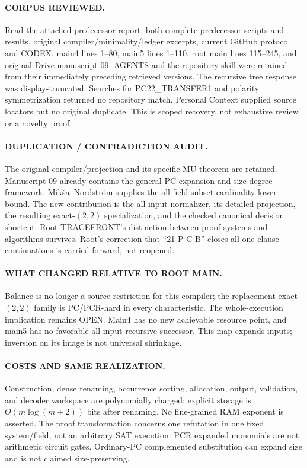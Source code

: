 \documentclass[11pt]{article}
\begin{document}
\paragraph{CORPUS REVIEWED.}
Read the attached predecessor report, both complete predecessor scripts and results, original compiler/minimality/ledger excerpts, current GitHub protocol and CODEX, main4 lines 1--80, main5 lines 1--110, root main lines 115--245, and original Drive manuscript 09. AGENTS and the repository skill were retained from their immediately preceding retrieved versions. The recursive tree response was display-truncated. Searches for PC22\_TRANSFER1 and polarity symmetrization returned no repository match. Personal Context supplied source locators but no original duplicate. This is scoped recovery, not exhaustive review or a novelty proof.

\paragraph{DUPLICATION / CONTRADICTION AUDIT.}
The original compiler/projection and its specific MU theorem are retained. Manuscript 09 already contains the general PC expansion and size-degree framework. Mik\v{s}a--Nordstr\"om supplies the all-field subset-cardinality lower bound. The new contribution is the all-input normalizer, its detailed projection, the resulting exact-$(2,2)$ specialization, and the checked canonical decision shortcut. Root TRACEFRONT's distinction between proof systems and algorithms survives. Root's correction that ``21 P C B'' closes all one-clause continuations is carried forward, not reopened.

\paragraph{WHAT CHANGED RELATIVE TO ROOT MAIN.}
Balance is no longer a source restriction for this compiler; the replacement exact-$(2,2)$ family is PC/PCR-hard in every characteristic. The whole-execution implication remains OPEN. Main4 has no new achievable resource point, and main5 has no favorable all-input recursive successor. This map expands inputs; inversion on its image is not universal shrinkage.

\paragraph{COSTS AND SAME REALIZATION.}
Construction, dense renaming, occurrence sorting, allocation, output, validation, and decoder workspace are polynomially charged; explicit storage is $O(m\log(m+2))$ bits after renaming. No fine-grained RAM exponent is asserted. The proof transformation concerns one refutation in one fixed system/field, not an arbitrary SAT execution. PCR expanded monomials are not arithmetic circuit gates. Ordinary-PC complemented substitution can expand size and is not claimed size-preserving.
\end{document}
